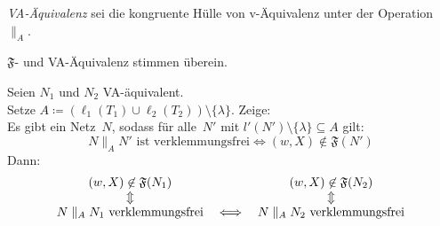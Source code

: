 \documentclass{cheat-sheet}
\newcommand{\Failure}{\mathfrak{F}} %
\newcommand{\parallelComposition}{\parallel} %
\begin{document}
\begin{defn}
  \emph{VA-Äquivalenz} sei die kongruente Hülle von v-Äquivalenz unter der Operation $\parallelComposition_A$.
\end{defn}

\begin{satz}
  $\Failure$- und VA-Äquivalenz stimmen überein.
\end{satz}

\begin{beweisidee}
  Seien $N_1$ und $N_2$ VA-äquivalent. \\
  Setze $A \coloneqq (\ell_1(T_1) \cup \ell_2(T_2)) \setminus \{ \lambda \}$.
  Zeige: \\
  Es gibt ein Netz~$N$, sodass für alle~$N'$ mit $l'(N') \setminus \{ \lambda \} \subseteq A$ gilt:
  \[
    N \parallelComposition_A N' \text{ ist verklemmungsfrei} \iff (w, X) \not\in \Failure(N')
  \]
  Dann:
  \[
    \begin{array}{c c c}
      (w, X) \not\in \Failure(N_1)
      && 
      (w, X) \not\in \Failure(N_2) \\
      \Updownarrow && \Updownarrow \\
      N \parallelComposition_A N_1 \text{ verklemmungsfrei}
      & \iff &
      N \parallelComposition_A N_2 \text{ verklemmungsfrei}
    \end{array}
  \]
  \begin{align*}
  \end{align*}
\end{beweisidee}

\end{document}

